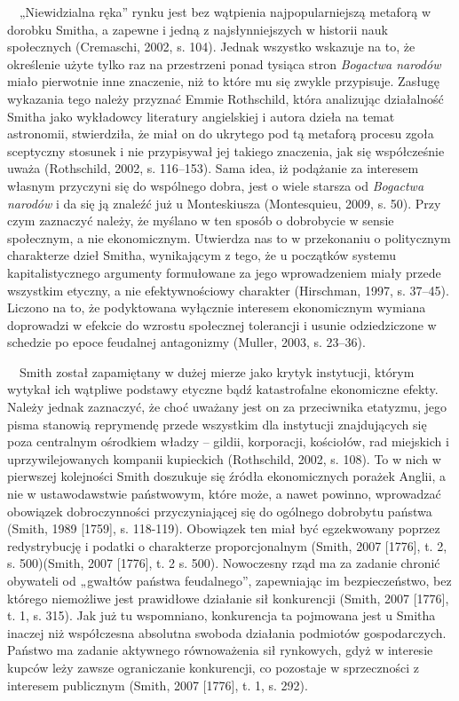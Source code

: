 \documentclass[a4paper]{article}
\begin{document}
 \ \ „Niewidzialna ręka” rynku jest bez wątpienia najpopularniejszą metaforą w dorobku Smitha, a zapewne i jedną z
najsłynniejszych w historii nauk społecznych \label{ref:RND56kR0uPFkj}(Cremaschi, 2002, s. 104). Jednak wszystko
wskazuje na to, że określenie użyte tylko raz na przestrzeni ponad tysiąca stron \textit{Bogactwa narodów} miało
pierwotnie inne znaczenie, niż to które mu się zwykle przypisuje. Zasługę wykazania tego należy przyznać Emmie
Rothschild, która analizując działalność Smitha jako wykładowcy literatury angielskiej i autora dzieła na temat
astronomii, stwierdziła, że miał on do ukrytego pod tą metaforą procesu zgoła sceptyczny stosunek i nie przypisywał jej
takiego znaczenia, jak się współcześnie uważa \label{ref:RNDX0KZpqEQRj}(Rothschild, 2002, s. 116–153). Sama idea, iż
podążanie za interesem własnym przyczyni się do wspólnego dobra, jest o wiele starsza od \textit{Bogactwa narodów }i da
się ją znaleźć już u Monteskiusza \label{ref:RNDStjVF4fTz2}(Montesquieu, 2009, s. 50). Przy czym zaznaczyć należy, że
myślano w ten sposób o dobrobycie w sensie społecznym, a nie ekonomicznym. Utwierdza nas to w przekonaniu o politycznym
charakterze dzieł Smitha, wynikającym z tego, że u początków systemu kapitalistycznego argumenty formułowane za jego
wprowadzeniem miały przede wszystkim etyczny, a nie efektywnościowy charakter \label{ref:RNDkxQbrekKjf}(Hirschman,
1997, s. 37–45). Liczono na to, że podyktowana wyłącznie interesem ekonomicznym wymiana doprowadzi w efekcie do wzrostu
społecznej tolerancji i usunie odziedziczone w schedzie po epoce feudalnej antagonizmy
\label{ref:RNDYmmEjf3eVb}(Muller, 2003, s. 23–36).

\ \ Smith został zapamiętany w dużej mierze jako krytyk instytucji, którym wytykał ich wątpliwe podstawy etyczne bądź
katastrofalne ekonomiczne efekty. Należy jednak zaznaczyć, że choć uważany jest on za przeciwnika etatyzmu, jego pisma
stanowią reprymendę przede wszystkim dla instytucji znajdujących się poza centralnym ośrodkiem władzy – gildii,
korporacji, kościołów, rad miejskich i uprzywilejowanych kompanii kupieckich \label{ref:RNDTxyZWr558R}(Rothschild,
2002, s. 108). To w nich w pierwszej kolejności Smith doszukuje się źródła ekonomicznych porażek Anglii, a nie w
ustawodawstwie państwowym, które może, a nawet powinno, wprowadzać obowiązek dobroczynności przyczyniającej się do
ogólnego dobrobytu państwa \label{ref:RNDW6eBaQF4K0}(Smith, 1989 [1759], s. 118-119). Obowiązek ten miał być
egzekwowany poprzez redystrybucję i podatki o charakterze proporcjonalnym \label{ref:RNDpQhGODGDa8}(Smith, 2007 [1776],
t. 2, s. 500)(Smith, 2007 [1776], t. 2 s. 500). Nowoczesny rząd ma za zadanie chronić obywateli od „gwałtów państwa
feudalnego”, zapewniając im bezpieczeństwo, bez którego niemożliwe jest prawidłowe działanie sił konkurencji
\label{ref:RNDWm3VFowt3n}(Smith, 2007 [1776], t. 1, s. 315). Jak już tu wspomniano, konkurencja ta pojmowana jest u
Smitha inaczej niż współczesna absolutna swoboda działania podmiotów gospodarczych. Państwo ma zadanie aktywnego
równoważenia sił rynkowych, gdyż w interesie kupców leży zawsze ograniczanie konkurencji, co pozostaje w sprzeczności z
interesem publicznym \label{ref:RND2jnRYZ0Sx9}(Smith, 2007 [1776], t. 1, s. 292).
\end{document}

